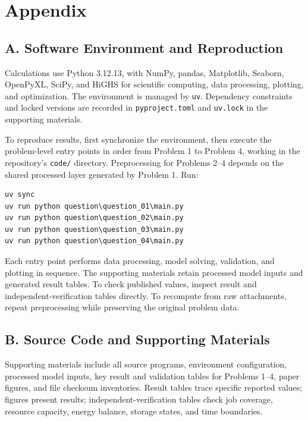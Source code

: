 \section*{Appendix}

\subsection*{A. Software Environment and Reproduction}

Calculations use Python 3.12.13, with NumPy, pandas, Matplotlib, Seaborn, OpenPyXL, SciPy, and HiGHS for scientific computing, data processing, plotting, and optimization. The environment is managed by \texttt{uv}. Dependency constraints and locked versions are recorded in \texttt{pyproject.toml} and \texttt{uv.lock} in the supporting materials.

To reproduce results, first synchronize the environment, then execute the problem-level entry points in order from Problem 1 to Problem 4, working in the repository's \texttt{code/} directory. Preprocessing for Problems 2--4 depends on the shared processed layer generated by Problem 1. Run:

\begin{lstlisting}[language={},basicstyle=\ttfamily\small]
uv sync
uv run python question\question_01\main.py
uv run python question\question_02\main.py
uv run python question\question_03\main.py
uv run python question\question_04\main.py
\end{lstlisting}

Each entry point performs data processing, model solving, validation, and plotting in sequence. The supporting materials retain processed model inputs and generated result tables. To check published values, inspect result and independent-verification tables directly. To recompute from raw attachments, repeat preprocessing while preserving the original problem data.

\subsection*{B. Source Code and Supporting Materials}

Supporting materials include all source programs, environment configuration, processed model inputs, key result and validation tables for Problems 1--4, paper figures, and file checksum inventories. Result tables trace specific reported values; figures present results; independent-verification tables check job coverage, resource capacity, energy balance, storage states, and time boundaries.

